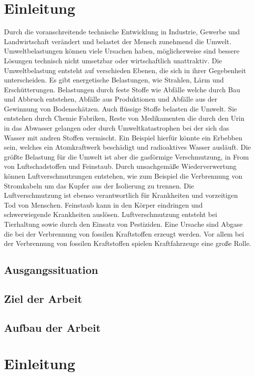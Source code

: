 \chapter{Einleitung}
Durch die voranschreitende technische Entwicklung in Industrie, Gewerbe und Landwirtschaft verändert und belastet der Mensch zunehmend die Umwelt.
Umweltbelastungen können viele Ursachen haben, möglicherweise sind bessere Lösungen technisch
nicht umsetzbar oder wirtschaftlich unattraktiv.
Die Umweltbelastung entsteht auf verschieden Ebenen, die sich in ihrer Gegebenheit unterscheiden.
Es gibt energetische Belastungen, wie Strahlen, Lärm und Erschütterungen.
Belastungen durch feste Stoffe wie Abfälle welche durch Bau und Abbruch entstehen,
Abfälle aus Produktionen und
Abfälle aus der Gewinnung von Bodenschätzen.
Auch flüssige Stoffe belasten die Umwelt.
Sie entstehen durch Chemie Fabriken,
Reste von Medikamenten die durch den Urin in das Abwasser gelangen oder
durch Umweltkatastrophen bei der sich das Wasser mit andren Stoffen vermischt.
Ein Beispiel hierfür könnte ein Erbebben sein,
welches ein Atomkraftwerk beschädigt und radioaktives Wasser ausläuft.
Die größte Belastung für die Umwelt ist aber die gasförmige Verschmutzung, in From von Luftschadstoffen und Feinstaub.
Durch unsachgemäße Wiederverwertung können Luftverschmutzungen entstehen,
wie zum Beispiel die Verbrennung von
Stromkabeln um das Kupfer aus der Isolierung zu trennen.
Die Luftverschmutzung ist ebenso verantwortlich für Krankheiten und vorzeitigen Tod von Menschen.
Feinstaub kann in den Körper eindringen und schwerwiegende Krankheiten auslösen.
Luftverschmutzung entsteht bei Tierhaltung sowie durch den Einsatz von Pestiziden.
Eine Ursache sind Abgase die bei der Verbrennung von fossilen Kraftstoffen erzeugt werden.
Vor allem bei der Verbrennung von fossilen Kraftstoffen spielen Kraftfahrzeuge eine große Rolle.


\section{Ausgangssituation}
\section{Ziel der Arbeit}
\section{Aufbau der Arbeit}



\chapter{Einleitung}

